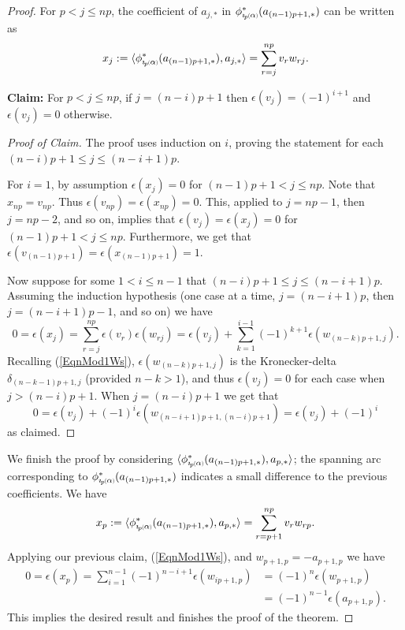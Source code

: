 \documentclass[11pt]{amsart}
\newcommand*{\subsmallp}[1]{\scalebox{.5}{\ensuremath#1}}
\newcommand{\subpp}[2][p]{\imath_{\hspace*{-1pt}#1}\hspace*{-.5pt}\subsmallp(#2\subsmallp)}
\theoremstyle{definition}
\begin{document}
\begin{proof}
For $p<j\le np$, the coefficient of $a_{j,\ast}$ in $\phi^\ast_{\subpp\alpha}(a_{(n-1)p+1,\ast})$ can be written as
      \begin{equation}x_j := \langle \phi^{\ast}_{\subpp\alpha}(a_{(n-1)p+1,\ast}), a_{j,\ast} \rangle = \sum_{r=j}^{np}v_rw_{rj}.
      \label{eqnCurveExpansion}
      \end{equation}

{\bf Claim:} For $p < j \le np$, if $j=(n-i)p+1$ then $\epsilon(v_j)=(-1)^{i+1}$ and $\epsilon(v_j)=0$ otherwise.
\begin{proof}[Proof of Claim] The proof uses induction on $i$, proving the statement for each $(n-i)p+1\le j\le (n-i+1)p$. 

For $i=1$, by assumption $\epsilon(x_j)=0$ for $(n-1)p+1<j\le np$. Note that $x_{np} = v_{np}$. Thus $\epsilon(v_{np})=\epsilon(x_{np}) = 0$. This, applied to $j=np-1$, then $j=np-2$, and so on, implies that $\epsilon(v_j) = \epsilon(x_j) = 0$ for $(n-1)p+1<j\le np$. Furthermore, we get that $\epsilon(v_{(n-1)p+1}) = \epsilon(x_{(n-1)p+1}) = 1$.

Now suppose for some $1<i\le n-1$ that $(n-i)p+1\le j \le (n-i+1)p$. Assuming the induction hypothesis (one case at a time, $j=(n-i+1)p$, then $j=(n-i+1)p-1$, and so on) we have
      \[0 = \epsilon(x_j) = \sum_{r=j}^{np}\epsilon(v_r)\epsilon(w_{rj}) = \epsilon(v_j) + \sum_{k=1}^{i-1}(-1)^{k+1}\epsilon(w_{(n-k)p+1,j}).\]
Recalling (\ref{EqnMod1Ws}), $\epsilon(w_{(n-k)p+1,j})$ is the Kronecker-delta $\delta_{(n-k-1)p+1,j}$ (provided $n-k>1$), and thus $\epsilon(v_j) = 0$ for each case when $j>(n-i)p+1$. When $j=(n-i)p+1$ we get that 
      \[0 = \epsilon(v_j) + (-1)^{i}\epsilon(w_{(n-i+1)p+1,(n-i)p+1}) = \epsilon(v_j) + (-1)^{i}\]
as claimed.
\end{proof}

We finish the proof by considering $\langle \phi^{\ast}_{\subpp\alpha}(a_{(n-1)p+1,\ast}), a_{p,\ast} \rangle$; the spanning arc corresponding to $\phi^{\ast}_{\subpp\alpha}(a_{(n-1)p+1,\ast})$ indicates a small difference to the previous coefficients. We have
      \[x_p := \langle \phi^{\ast}_{\subpp\alpha}(a_{(n-1)p+1,\ast}), a_{p,\ast} \rangle = \sum_{r=p+1}^{np}v_rw_{rp}.\]
Applying our previous claim, (\ref{EqnMod1Ws}), and $w_{p+1,p}=-a_{p+1,p}$ we have
        \begin{align*}
        0 = \epsilon(x_p)   = \sum_{i=1}^{n-1}(-1)^{n-i+1}\epsilon(w_{ip+1,p})  &= (-1)^n\epsilon(w_{p+1,p})\\
                                                                                &= (-1)^{n-1}\epsilon(a_{p+1,p}).
        \end{align*}
This implies the desired result and finishes the proof of the theorem. 
\end{proof}
\end{document}
